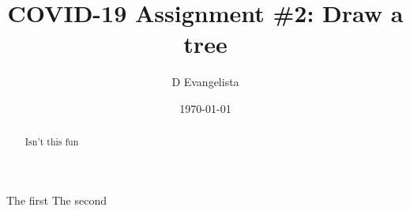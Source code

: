 \documentclass{exam}
\title{COVID-19 Assignment \#2: Draw a tree}
\author{D Evangelista}
\date{\today}
\begin{document}
\maketitle

\begin{abstract}
  Isn't this fun
\end{abstract}

\begin{questions}
  \question The first
  \question The second
\end{questions}
\end{document}
